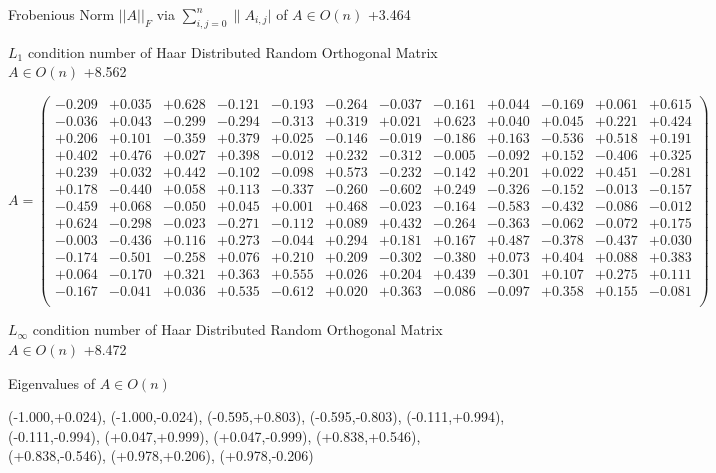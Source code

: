\documentclass[9pt]{article}
\theoremstyle{plain}
\theoremstyle{definition}
\theoremstyle{remark}
\numberwithin{equation}{section}
\begin{document}
Frobenious Norm  $||A||_{\textit{F}}$ via $\sum\limits_{i,j =0}^{n} \|A_{i,j}|$   of  $A \in O(n)$  +3.464

$L_1$ condition number of Haar Distributed Random Orthogonal Matrix $A \in O(n)$ +8.562

$A = \left(
\begin{array}{
cccccccccccc}
-0.209 & +0.035 & +0.628 & -0.121 & -0.193 & -0.264 & -0.037 & -0.161 & +0.044 & -0.169 & +0.061 & +0.615 \\
-0.036 & +0.043 & -0.299 & -0.294 & -0.313 & +0.319 & +0.021 & +0.623 & +0.040 & +0.045 & +0.221 & +0.424 \\
+0.206 & +0.101 & -0.359 & +0.379 & +0.025 & -0.146 & -0.019 & -0.186 & +0.163 & -0.536 & +0.518 & +0.191 \\
+0.402 & +0.476 & +0.027 & +0.398 & -0.012 & +0.232 & -0.312 & -0.005 & -0.092 & +0.152 & -0.406 & +0.325 \\
+0.239 & +0.032 & +0.442 & -0.102 & -0.098 & +0.573 & -0.232 & -0.142 & +0.201 & +0.022 & +0.451 & -0.281 \\
+0.178 & -0.440 & +0.058 & +0.113 & -0.337 & -0.260 & -0.602 & +0.249 & -0.326 & -0.152 & -0.013 & -0.157 \\
-0.459 & +0.068 & -0.050 & +0.045 & +0.001 & +0.468 & -0.023 & -0.164 & -0.583 & -0.432 & -0.086 & -0.012 \\
+0.624 & -0.298 & -0.023 & -0.271 & -0.112 & +0.089 & +0.432 & -0.264 & -0.363 & -0.062 & -0.072 & +0.175 \\
-0.003 & -0.436 & +0.116 & +0.273 & -0.044 & +0.294 & +0.181 & +0.167 & +0.487 & -0.378 & -0.437 & +0.030 \\
-0.174 & -0.501 & -0.258 & +0.076 & +0.210 & +0.209 & -0.302 & -0.380 & +0.073 & +0.404 & +0.088 & +0.383 \\
+0.064 & -0.170 & +0.321 & +0.363 & +0.555 & +0.026 & +0.204 & +0.439 & -0.301 & +0.107 & +0.275 & +0.111 \\
-0.167 & -0.041 & +0.036 & +0.535 & -0.612 & +0.020 & +0.363 & -0.086 & -0.097 & +0.358 & +0.155 & -0.081 \\
\end{array}
\right)$ \newline 

$L_{\infty}$ condition number of Haar Distributed Random Orthogonal Matrix $A \in O(n)$ +8.472

Eigenvalues of $A \in O(n)$

(-1.000,+0.024), (-1.000,-0.024), (-0.595,+0.803), (-0.595,-0.803), (-0.111,+0.994), (-0.111,-0.994), (+0.047,+0.999), (+0.047,-0.999), (+0.838,+0.546), (+0.838,-0.546), (+0.978,+0.206), (+0.978,-0.206)
\end{document}
